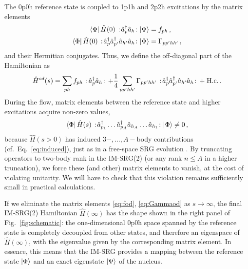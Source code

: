 The 0p0h reference state is coupled to 1p1h and 2p2h excitations by the matrix elements
\begin{align}
  \matrixe{\Phi}{\hat{H}(0)\nord{\aaO_{p}\aO_{h}}}{\Phi}&=f_{ph}\,,\label{eq:fod}\\
  \matrixe{\Phi}{\hat{H}(0)\nord{\aaO_{p}\aaO_{p'}\aO_{h'}\aO_{h}}}{\Phi}&=\Gamma_{pp'hh'}\label{eq:Gammaod}\,,
\end{align}
and their Hermitian conjugates. Thus, we define the off-diagonal part of the Hamiltonian as
\begin{equation}
  \hat{H}^{od}(s) = \sum_{ph}f_{ph}\nord{\aaO_p\aO_h} + \frac{1}{4}\sum_{pp'hh'}\Gamma_{pp'hh'}\nord{\aaO_p\aaO_{p'}\aO_{h'}\aO_h}
                +\; \text{H.c.}\label{eq:def_Hod}\,.
\end{equation}
During the flow, matrix elements between the reference state and higher excitations acquire non-zero values,
\begin{equation}\label{eq:induced_od}
  \matrixe{\Phi}{\hat{H}(s)\nord{\aaO_{p_1}\ldots\aaO_{p_A}\aO_{h_{A}}\ldots\aO_{h_1}}}{\Phi}\neq 0\,,
\end{equation}
because $\hat{H}(s>0)$ has induced $3-,\ldots,A-$body contributions (cf.~Eq.~\eqref{eq:induced}), just as in a 
free-space SRG evolution \cite{Bogner:2010pq,Jurgenson:2009bs,Hebeler:2012ly}. By truncating operators to 
two-body rank in the IM-SRG(2) (or any rank $n\leq A$ in a higher truncation), we force these (and other) 
matrix elements to vanish, at the cost of violating unitarity. We will have to check that this violation 
remains sufficiently small in practical calculations.

If we eliminate the matrix elements \eqref{eq:fod}, \eqref{eq:Gammaod} as $s\to\infty$, the final IM-SRG(2) 
Hamiltonian $\hat{H}(\infty)$ has the shape shown in the right panel of Fig.~\ref{fig:schematic}: the 
one-dimensional $0$p$0$h space spanned by the reference state is completely decoupled from other 
states, and therefore an eigenspace of $\hat{H}(\infty)$, with the eigenvalue given by the corresponding 
matrix element. In essence, this means that the IM-SRG provides a mapping between the reference 
state $\ket{\Phi}$ and an exact eigenstate $\ket{\Psi}$ of the nucleus. 

